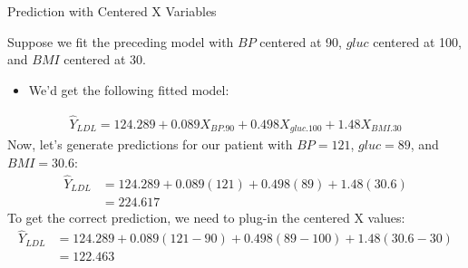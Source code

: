 \documentclass{beamer}\usepackage[]{graphicx}\usepackage[]{color}
\begin{document}

\begin{frame}{Prediction with Centered X Variables}
  


Suppose we fit the preceding model with $BP$ centered at 90, $gluc$ centered at 
100, and $BMI$ centered at 30.
\begin{itemize}
\item We'd get the following fitted model:
\end{itemize}
\begin{align*}
  \hat{Y}_{LDL} = 124.289 + 0.089 X_{BP.90} + 0.498 X_{gluc.100} + 1.48 X_{BMI.30}
\end{align*}
\pause
Now, let's generate predictions for our patient with $BP = 121$, 
$gluc = 89$, and $BMI = 30.6$:
\begin{align*}
  \hat{Y}_{LDL} &= 124.289 + 0.089 (121) + 0.498 
  (89) + 1.48 (30.6)\\
  &= 224.617
\end{align*}
\pause
To get the correct prediction, we need to plug-in the centered X values:
\begin{align*}
  \hat{Y}_{LDL} &= 124.289 + 0.089 (121 - 90) + 0.498 
  (89 - 100) + 1.48 (30.6 - 30)\\
  &= 122.463
\end{align*}

\end{frame}

\end{document}
